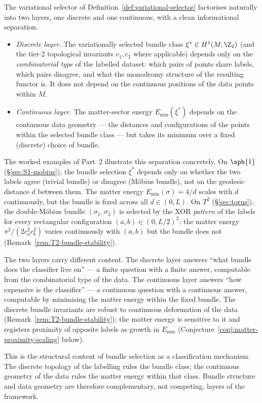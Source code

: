 \begin{remark}\label{rem:discrete-continuous-separation}
The variational selector of
Definition~\ref{def:variational-selector} factorises naturally into
two layers, one discrete and one continuous, with a clean
informational separation.

\begin{itemize}[leftmargin=2em]
\item \emph{Discrete layer.} The variationally selected bundle
class $\xi^*\in H^1(M,\Z_2)$ (and the tier-2 topological invariants
$c_1, c_2$ where applicable) depends only on the
\emph{combinatorial type} of the labelled dataset: which pairs of
points share labels, which pairs disagree, and what the
monodromy structure of the resulting functor is. It does not depend
on the continuous positions of the data points within $M$.
\item \emph{Continuous layer.} The matter-sector energy
$E_{\min}(\xi^*)$ depends on the continuous data geometry --- the
distances and configurations of the points within the selected
bundle class --- but takes its minimum over a fixed (discrete)
choice of bundle.
\end{itemize}

The worked examples of Part~2 illustrate this separation
concretely. On $\sph{1}$ (\S\ref{sec:S1-mobius}), the bundle
selection $\xi^*$ depends only on whether the two labels agree
(trivial bundle) or disagree (M\"obius bundle), not on the
geodesic distance $d$ between them. The matter energy
$E_{\min}(\sigma)=4/d$ scales with $d$ continuously, but the bundle
is fixed across all $d\in(0,L)$. On $T^2$ (\S\ref{sec:torus}), the
double-M\"obius bundle $(\sigma_1,\sigma_2)$ is selected by the
XOR \emph{pattern} of the labels for every rectangular
configuration $(a,b)\in(0,L/2)^2$; the matter energy
$\pi^2/(2 c_a^2 c_b^2)$ varies continuously with $(a,b)$ but the
bundle does not (Remark~\ref{rem:T2-bundle-stability}).

The two layers carry different content. The discrete layer answers
``what bundle does the classifier live on'' --- a finite question
with a finite answer, computable from the combinatorial type of the
data. The continuous layer answers ``how expensive is the
classifier'' --- a continuous question with a continuous answer,
computable by minimising the matter energy within the fixed bundle.
The discrete bundle invariants are robust to continuous deformation
of the data (Remark~\ref{rem:T2-bundle-stability}); the matter
energy is sensitive to it and registers proximity of opposite
labels as growth in $E_{\min}$
(Conjecture~\ref{conj:matter-proximity-scaling} below).

This is the structural content of bundle selection as a
classification mechanism. The discrete topology of the labelling
rules the bundle class; the continuous geometry of the data rules
the matter energy within that class. Bundle structure and data
geometry are therefore complementary, not competing, layers of the
framework.
\end{remark}

